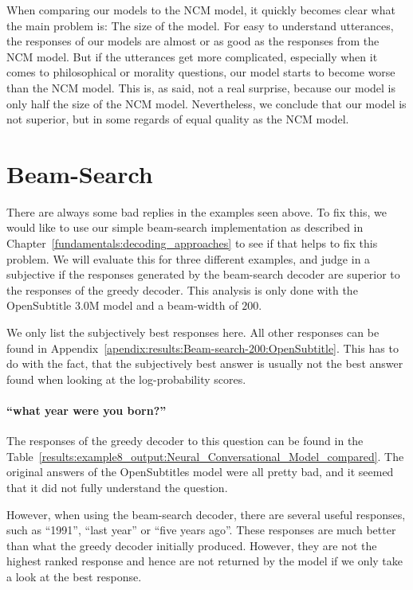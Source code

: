 When comparing our models to the NCM model, it quickly becomes clear what the main problem is: The size of the model. For easy to understand utterances, the responses of our models are almost or as good as the responses from the NCM model. But if the utterances get more complicated, especially when it comes to philosophical or morality questions, our model starts to become worse than the NCM model. This is, as said, not a real surprise, because our model is only half the size of the NCM model. Nevertheless, we conclude that our model is not superior, but in some regards of equal quality as the NCM model.

\section{Beam-Search}
\label{results:beam_search}
There are always some bad replies in the examples seen above. To fix this, we would like to use our simple beam-search implementation as described in Chapter~\ref{fundamentals:decoding_approaches} to see if that helps to fix this problem. We will evaluate this for three different examples, and judge in a subjective if the responses generated by the beam-search decoder are superior to the responses of the greedy decoder. This analysis is only done with the OpenSubtitle 3.0M model and a beam-width of $200$.

We only list the subjectively best responses here. All other responses can be found in Appendix~\ref{apendix:results:Beam-search-200:OpenSubtitle}. This has to do with the fact, that the subjectively best answer is usually not the best answer found when looking at the log-probability scores.

\paragraph{``what year were you born?''} The responses of the greedy decoder to this question can be found in the Table~\ref{results:example8_output:Neural_Conversational_Model_compared}. The original answers of the OpenSubtitles model were all pretty bad, and it seemed that it did not fully understand the question.

However, when using the beam-search decoder, there are several useful responses, such as ``1991'', ``last year'' or ``five years ago''. These responses are much better than what the greedy decoder initially produced. However, they are not the highest ranked response and hence are not returned by the model if we only take a look at the best response.

